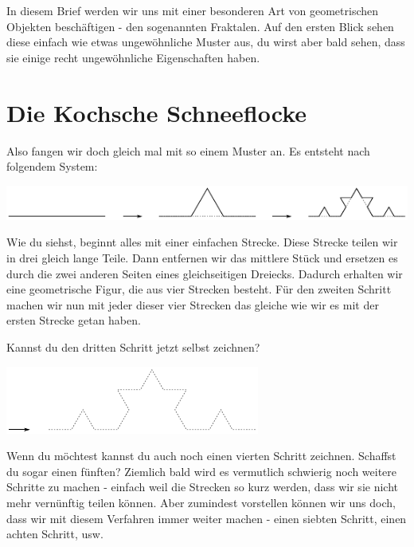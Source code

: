 \documentclass[a4paper,ngerman,12pt]{scrartcl}
\theoremstyle{definition}
\theoremstyle{plain}
\theoremstyle{remark}
\begin{document}
In diesem Brief werden wir uns mit einer besonderen Art von geometrischen Objekten beschäftigen - den sogenannten Fraktalen. Auf den ersten Blick sehen diese einfach wie etwas ungewöhnliche Muster aus, du wirst aber bald sehen, dass sie einige recht ungewöhnliche Eigenschaften haben. 

\section{Die Kochsche Schneeflocke}

Also fangen wir doch gleich mal mit so einem Muster an. Es entsteht nach folgendem System:

\begin{center}
	\includegraphics[width=.9\textwidth]{Bilder/Schneeflocke-Konstruktion1.pdf}
\end{center}

Wie du siehst, beginnt alles mit einer einfachen Strecke. Diese Strecke teilen wir in drei gleich lange Teile. Dann entfernen wir das mittlere Stück und ersetzen es durch die zwei anderen Seiten eines gleichseitigen Dreiecks. Dadurch erhalten wir eine geometrische Figur, die aus vier Strecken besteht. Für den zweiten Schritt machen wir nun mit jeder dieser vier Strecken das gleiche wie wir es mit der ersten Strecke getan haben.

Kannst du den dritten Schritt jetzt selbst zeichnen?

\begin{center}
	\includegraphics[width=.7\textwidth]{Bilder/Schneeflocke-Konstruktion2.pdf}
\end{center}

Wenn du möchtest kannst du auch noch einen vierten Schritt zeichnen. Schaffst du sogar einen fünften? Ziemlich bald wird es vermutlich schwierig noch weitere Schritte zu machen - einfach weil die Strecken so kurz werden, dass wir sie nicht mehr vernünftig teilen können. Aber zumindest vorstellen können wir uns doch, dass wir mit diesem Verfahren immer weiter machen - einen siebten Schritt, einen achten Schritt, usw. 
\end{document}
